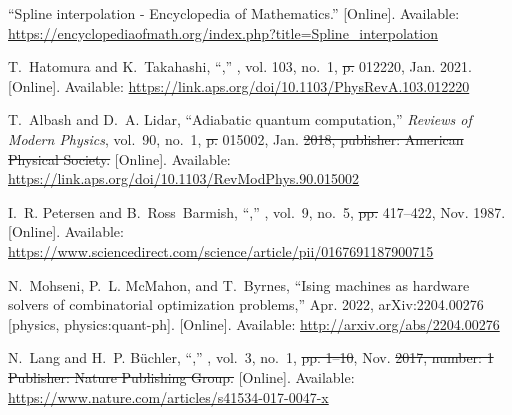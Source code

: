 \documentclass[a4paper,oneside,11pt]{book}
\providecommand{\DIFaddtex}[1]{{\protect\color{blue}\uwave{#1}}} %
\providecommand{\DIFdeltex}[1]{{\protect\color{red}\sout{#1}}}                      %
\providecommand{\DIFaddbegin}{} %
\providecommand{\DIFaddend}{} %
\providecommand{\DIFdelbegin}{} %
\providecommand{\DIFdelend}{} %
\providecommand{\DIFadd}[1]{\texorpdfstring{\DIFaddtex{#1}}{#1}} %
\providecommand{\DIFdel}[1]{\texorpdfstring{\DIFdeltex{#1}}{}} %
\newcommand{\DIFscaledelfig}{0.5}
\newlength{\DIFdelgraphicswidth} %
\newlength{\DIFdelgraphicsheight} %
\newcommand{\DIFaddincludegraphics}[2][]{{\color{blue}\fbox{\DIFOincludegraphics[#1]{#2}}}} %
\newcommand{\DIFdelincludegraphics}[2][]{%
\sbox{\DIFdelgraphicsbox}{\DIFOincludegraphics[#1]{#2}}%
\settoboxwidth{\DIFdelgraphicswidth}{\DIFdelgraphicsbox} %
\settoboxtotalheight{\DIFdelgraphicsheight}{\DIFdelgraphicsbox} %
\scalebox{\DIFscaledelfig}{%
\parbox[b]{\DIFdelgraphicswidth}{\usebox{\DIFdelgraphicsbox}\\[-\baselineskip] \rule{\DIFdelgraphicswidth}{0em}}\llap{\resizebox{\DIFdelgraphicswidth}{\DIFdelgraphicsheight}{%
\setlength{\unitlength}{\DIFdelgraphicswidth}%
\begin{picture}(1,1)%
\thicklines\linethickness{2pt} %
{\color[rgb]{1,0,0}\put(0,0){\framebox(1,1){}}}%
{\color[rgb]{1,0,0}\put(0,0){\line( 1,1){1}}}%
{\color[rgb]{1,0,0}\put(0,1){\line(1,-1){1}}}%
\end{picture}%
}\hspace*{3pt}}} %
} %
\DeclareRobustCommand{\DIFaddbegin}{\DIFOaddbegin \let\includegraphics\DIFaddincludegraphics} %
\DeclareRobustCommand{\DIFaddend}{\DIFOaddend \let\includegraphics\DIFOincludegraphics} %
\DeclareRobustCommand{\DIFdelbegin}{\DIFOdelbegin \let\includegraphics\DIFdelincludegraphics} %
\DeclareRobustCommand{\DIFdelend}{\DIFOaddend \let\includegraphics\DIFOincludegraphics} %
\begin{document}
\begin{thebibliography}{100}
\BIBentryALTinterwordspacing
``Spline interpolation - {Encyclopedia} of {Mathematics}.'' [Online].
  Available:
  \url{https://encyclopediaofmath.org/index.php?title=Spline_interpolation}
\BIBentrySTDinterwordspacing

\BIBentryALTinterwordspacing
T.~Hatomura and K.~Takahashi, ``,'' \emph{}, vol. 103,
  no.~1,  \DIFdelbegin \DIFdel{p. }\DIFdelend 012220, Jan. 2021. [Online]. Available:
  \url{https://link.aps.org/doi/10.1103/PhysRevA.103.012220}
\BIBentrySTDinterwordspacing

\BIBentryALTinterwordspacing
T.~Albash and D.~A. Lidar, ``Adiabatic quantum computation,'' \emph{Reviews of
  Modern Physics}, vol.~90, no.~1,  \DIFdelbegin \DIFdel{p. }\DIFdelend 015002, Jan. \DIFdelbegin \DIFdel{2018, publisher: American
  Physical Society. }\DIFdelend \DIFaddbegin \DIFadd{2018. }\DIFaddend [Online]. Available:
  \url{https://link.aps.org/doi/10.1103/RevModPhys.90.015002}
\BIBentrySTDinterwordspacing

\BIBentryALTinterwordspacing
I.~R. Petersen and B.~Ross~Barmish, ``,''
  \emph{}, vol.~9, no.~5,
  \DIFdelbegin \DIFdel{pp. }\DIFdelend 417--422, Nov. 1987. [Online]. Available:
  \url{https://www.sciencedirect.com/science/article/pii/0167691187900715}
\BIBentrySTDinterwordspacing

\BIBentryALTinterwordspacing
N.~Mohseni, P.~L. McMahon, and T.~Byrnes, ``Ising machines as hardware solvers
  of combinatorial optimization problems,'' Apr. 2022, arXiv:2204.00276
  [physics, physics:quant-ph]. [Online]. Available:
  \url{http://arxiv.org/abs/2204.00276}
\BIBentrySTDinterwordspacing

\BIBentryALTinterwordspacing
N.~Lang and H.~P. Büchler, ``,''
  \emph{}, vol.~3, no.~1, \DIFdelbegin \DIFdel{pp.
  1--10}\DIFdelend \DIFaddbegin \DIFadd{~47}\DIFaddend ,
  Nov. \DIFdelbegin \DIFdel{2017, number: 1 Publisher: Nature Publishing Group. }\DIFdelend \DIFaddbegin \DIFadd{2017. }\DIFaddend [Online]. Available:
  \url{https://www.nature.com/articles/s41534-017-0047-x}
\BIBentrySTDinterwordspacing


\end{thebibliography}
\end{document}
